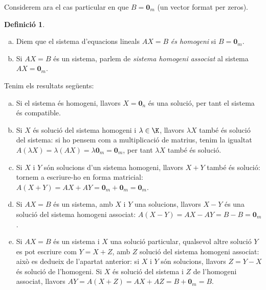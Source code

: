 \documentclass[a4paper,12pt,twoside]{article}
\newcommand{\1}{\mathbf{1}}
\newcommand{\0}{\mathbf{0}}
\theoremstyle{definition}
\newtheorem{definicio}[teorema]{Definició}
\theoremstyle{remark}
\begin{document}
Considerem ara el cas particular en que $B=\0_m$ (un vector format per zeros).
\begin{definicio}
	\begin{enumerate}[(a)]
		\item Diem que el sistema d'equacions lineals $AX=B$ \emph{és homogeni} si $B=\0_m$.
		\item Si $AX=B$ és un sistema, parlem de \emph{sistema homogeni associat} al sistema $AX=\0_m$.
	\end{enumerate}
\end{definicio}
Tenim els resultats següents:
\begin{enumerate}[(a)]
	\item Si el sistema és homogeni, llavors $X=\0_n$ és una solució, per tant el sistema és compatible.
	\item Si $X$ és solució del sistema homogeni i $\lambda\in\K$, llavors $\lambda X$ també és solució del sistema: si ho pensem com a multiplicació de matrius, tenim la igualtat $A(\lambda X)=\lambda (AX)=\lambda \0_m=\0_m$, per tant $\lambda X$ també és solució.
	\item Si $X$ i $Y$ són solucions d'un sistema homogeni, llavors $X+Y$ també és solució: tornem a escriure-ho en forma matricial: $A(X+Y)=AX+AY=\0_m+\0_m=\0_m$.
	\item Si $AX=B$ és un sistema, amb $X$ i $Y$ una solucions, llavors $X-Y$ és una solució del sistema homogeni associat: $A(X-Y)=AX-AY=B-B=\0_m$.
	\item Si $AX=B$ és un sistema i $X$ una solució particular, qualsevol altre solució $Y$ es pot escriure com $Y=X+Z$, amb $Z$ solució del sistema homogeni associat: això es dedueix de l'apartat anterior: si $X$ i $Y$ són solucions, llavors $Z=Y-X$ és solució de l'homogeni. Si $X$ és solució del sistema i $Z$ de l'homogeni associat, llavors $AY=A(X+Z)=AX+AZ=B+\0_m=B$.
\end{enumerate}
\end{document}
